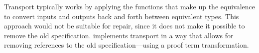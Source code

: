 Transport typically works by applying the functions that make up the equivalence to convert
inputs and outputs back and forth between equivalent types.
This approach would not be suitable for repair, since it does not make it possible to remove the old specification.
\toolname implements transport in a way that allows for removing references to the old specification---using a proof term transformation.







